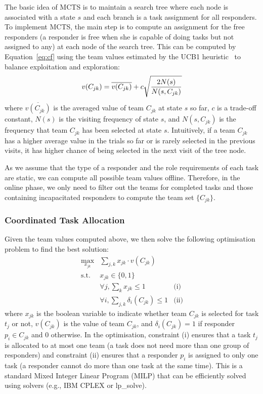The basic idea of MCTS is to maintain a search tree where each node
is associated with a state $s$ and each branch is a task assignment
for all responders. To implement MCTS, the main step is to compute
an assignment for the free responders (a responder is free when she
is capable of doing tasks but not assigned to any) at each
node of the search tree. This can be computed by
Equation~\ref{eq:cf} using the team values estimated by the UCB1
heuristic~\cite{auer2002finite} to balance exploitation and
exploration:
\begin{equation}\small
  v(C_{jk}) = \overline{v(C_{jk})} + c\sqrt{\frac{2N(s)}{N(s, C_{jk})}}
\end{equation}
where $\overline{v(C_{jk})}$ is the averaged value of team $C_{jk}$
at state $s$ so far, $c$ is a trade-off constant, $N(s)$ is the
visiting frequency of state $s$, and $N(s, C_{jk})$ is the
frequency that team $C_{jk}$ has been selected at state $s$.
Intuitively, if a team $C_{jk}$ has  a higher average value in the
trials so far or is rarely selected in the previous visits, it has
higher chance of being selected in the next visit of the tree node.

As we assume that the type of a responder and the role requirements
of each task are static, we can compute all possible team values
offline. Therefore, in the online phase, we only need to filter out
the teams for completed tasks and those containing
incapacitated responders to compute the team set $\{ C_{jk} \}$.

\subsubsection{Coordinated Task Allocation}
\noindent Given the team values computed above, we then solve the
following optimisation problem to find the best solution:
\begin{equation}
  \begin{array}{lll}
    \max\limits_{x_{jk}} & \sum_{j, k} x_{jk} \cdot v(C_{jk}) & \\[2pt]
    \mbox{s.t.} & x_{jk} \in \{0, 1\} & \\[2pt]
    & \forall j, \sum_{k} x_{jk} \leq 1 & \mbox{(i)} \\[2pt]
    & \forall i, \sum_{j, k} \delta_i(C_{jk}) \leq 1 & \mbox{(ii)}
  \end{array}
  \label{eq:cf}
\end{equation}
where $x_{jk}$ is the boolean variable to indicate whether team
$C_{jk}$ is selected for task $t_j$ or not, $v(C_{jk})$ is the value of team $C_{jk}$, and $\delta_i(C_{jk}) =
1$ if responder $p_i\in C_{jk}$ and 0 otherwise. In the
optimisation, constraint (i) ensures that a task $t_j$ is allocated
to at most one team (a task does not need more than one group of
responders) and constraint (ii) ensures that a responder $p_i$ is
assigned to only one task (a responder cannot do more than one task
at the same time). This is a standard Mixed Integer Linear Program
(MILP) that can be efficiently solved  using solvers (e.g., IBM CPLEX or lp\_solve).

